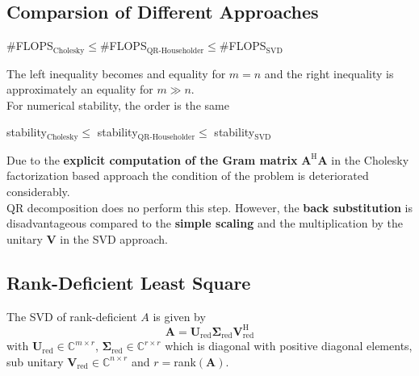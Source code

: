 \documentclass[english]{latex4ei/latex4ei_sheet}
\begin{document}
\begin{sectionbox}
\subsection{Comparsion of Different Approaches}
\begin{emphbox}
	\large \#FLOPS$_{\text{Cholesky}} \leq$\#FLOPS$_{\text{QR-Householder}}\leq$\#FLOPS$_{\text{SVD}}$
\end{emphbox}
The left inequality becomes and equality for $m=n$ and the right inequality is approximately an equality for $m\gg n$.\\
For numerical stability, the order is the same
\begin{emphbox}
	\large stability$_{\text{Cholesky}} \leq$ stability$_{\text{QR-Householder}}\leq$ stability$_{\text{SVD}}$
\end{emphbox}
Due to the \textbf{explicit computation of the Gram matrix} $\mathbf{A}^\text{H}\mathbf{A}$ in the Cholesky factorization based approach the condition of the problem is deteriorated considerably.\\
QR decomposition does no perform this step. However, the \textbf{back substitution} is disadvantageous compared to the \textbf{simple scaling} and the multiplication by the unitary $\mathbf{V}$ in the SVD approach.
\end{sectionbox}
\begin{sectionbox}
\subsection{Rank-Deficient Least Square}
The SVD of rank-deficient $A$ is given by
$$\mathbf{A} = \mathbf{U}_{\text{red}}\mathbf{\Sigma}_{\text{red}}\mathbf{V}^\text{H}_{\text{red}}$$
with $\mathbf{U}_{\text{red}}\in\mathbb{C}^{m\times r}$, $\mathbf{\Sigma}_{\text{red}}\in\mathbb{C}^{r \times r}$ which is diagonal with positive diagonal elements, sub unitary $\mathbf{V}_{\text{red}} \in \mathbb{C}^{n \times r}$ and $r=$rank$(\mathbf{A})$.
\end{sectionbox}
\end{document}
